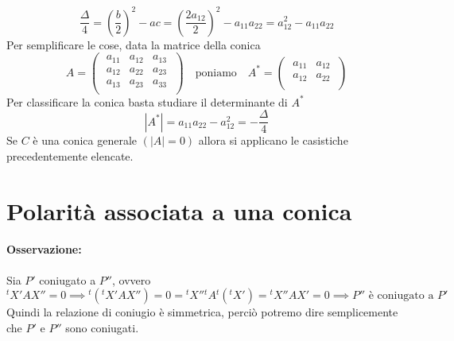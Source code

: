 \[
\frac{\Delta}{4} = \left( \frac{b}{2} \right) ^2 - ac = \left( \frac{2a_{12}}{2} \right) ^2 - a_{11} a_{22} = a_{12}^2 - a_{11} a_{22}
\]Per semplificare le cose, data la matrice della conica \[
A = 
\left( \; \begin{matrix}
    a_{11} & a_{12} & a_{13} \\
    a_{12} & a_{22} & a_{23} \\
    a_{13} & a_{23} & a_{33} \\
\end{matrix} \; \right)
\quad \text{poniamo} \quad A^* =
\left( \; \begin{matrix}
    a_{11} & a_{12} \\
    a_{12} & a_{22} \\
\end{matrix} \; \right) \]
Per classificare la conica basta studiare il determinante di \(A^{*}\)
\[
|A^{*}| = a_{11}a_{22}-a_{12}^2= - \frac{\Delta}{4}
\] Se \(C\) è una conica generale \((|A| = 0)\) allora si applicano le casistiche precedentemente elencate.

\section{Polarità associata a una conica}


\paragraph{Osservazione:} Sia \(P'\) coniugato a \(P ''\), ovvero \[
    {^tX'} A X '' = 0 \implies {^t({^tX'}AX '')} = 0 = {^tX ''} {^tA}{^t({^tX'})} = {^tX ''} A X' = 0 \implies P '' \text{ è coniugato a } P' 
\] Quindi la relazione di coniugio è simmetrica, perciò potremo dire semplicemente che \(P'\) e \(P ''\) sono coniugati.


